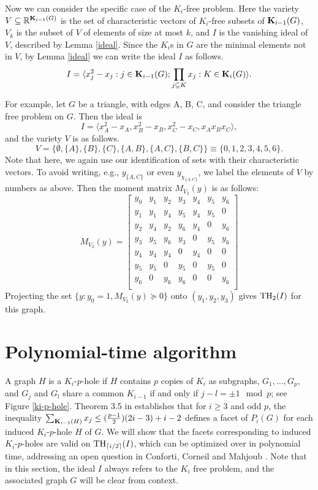 Now we can consider the specific case of the $K_i$-free problem. Here the variety $V \subseteq \mathbb{R}^{\mathbf{K}_{i-1}(G)}$ is the set of characteristic vectors of $K_i$-free subsets of $\mathbf{K}_{i-1}(G)$, $V_k$ is the subset of $V$ of elements of size at most $k$, and $I$ is the vanishing ideal of $V$, described by Lemma \ref{ideal}. Since the $K_i$s in $G$ are the minimal elements not in $V$, by Lemma \ref{ideal} we can write the ideal $I$ as follows.
$$I=\langle x_j^2 - x_j :j \in \mathbf{K}_{i-1}(G); \prod_{j \subseteq K}x_j: K \in \mathbf{K}_i(G)\rangle.$$

For example, let $G$ be a triangle, with edges A, B, C, and consider the triangle free problem on $G$. Then the ideal is
$$I = \langle x_A^2 - x_A, x_B^2 - x_B,  x_C^2 - x_C, x_Ax_Bx_C \rangle,$$
and the variety $V$ is as follows.
$$V = \{\emptyset,\{A\},\{B\},\{C\},\{A,B\},\{A,C\},\{B,C\}\} \equiv \{0,1,2,3,4,5,6\}.$$ 
Note that here, we again use our identification of sets with their characteristic vectors. To avoid writing, e.g., $y_{\{A,C\}}$ or even $y_{\chi_{\{A,C\}}}$, we label the elements of $V$ by numbers as above.
Then the moment matrix $M_{V_2}(y)$ is as follows:
$$M_{V_2}(y) = 
\left[
\begin{array}{ccccccc}
y_0 & y_1 & y_2 & y_3 & y_4 & y_5 & y_6 \\
y_1 & y_1 & y_4 & y_5 & y_4 & y_5 & 0 \\
y_2 & y_4 & y_2 & y_6 & y_4 & 0 & y_6 \\
y_3 & y_5 & y_6 & y_3 & 0 & y_5 & y_6 \\
y_4 & y_4 & y_4 & 0 & y_4 &0 & 0 \\
y_5& y_5 & 0 & y_5 & 0 & y_5 & 0 \\
y_6 & 0 & y_6 & y_6 & 0 & 0 & y_6 \\
\end{array}
\right]$$
Projecting the set $\{y: y_0 = 1, M_{V_2}(y) \succeq 0 \}$ onto $(y_1,y_2,y_3)$ gives $\textup{TH}_2(I)$ for this graph.

\section{Polynomial-time algorithm}
A graph $H$ is a $K_i$-$p$-hole if $H$ contains $p$ copies of $K_i$ as subgraphs, $G_1, \ldots, G_p$, and $G_j$ and $G_l$ share a common $K_{i-1}$ if and only if $j-l = \pm 1 \mod p$; see Figure \ref{ki-p-hole}. Theorem 3.5 in \cite{conforti} establishes that for $i \ge 3$ and odd $p$, the inequality $\sum_{\mathbf{K}_{i-1}(H)} x_j \le (\frac{p-1}{2})(2i-3)+i-2$ defines a facet of $P_i(G)$ for each induced $K_i$-$p$-hole $H$ of $G$.
We will show that the facets corresponding to induced $K_i$-$p$-holes are valid on $\textup{TH}_{\lceil i/2 \rceil}(I)$, which can be optimized over in polynomial time, addressing an open question in Conforti, Corneil and Mahjoub \cite{conforti}. Note that in this section, the ideal $I$ always refers to the $K_i$ free problem, and the associated graph $G$ will be clear from context.

